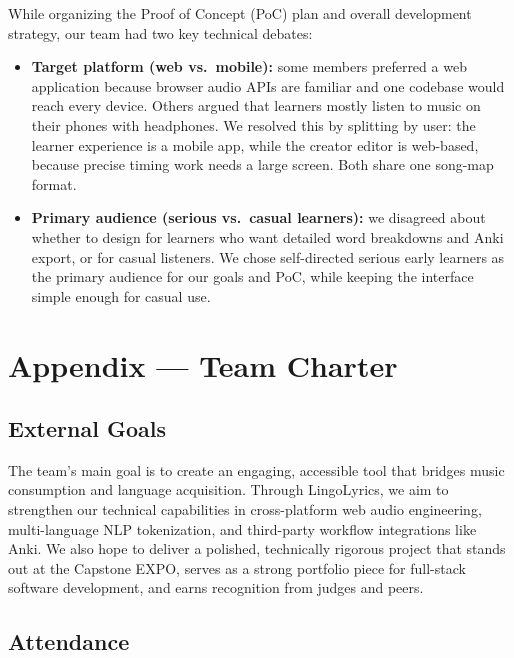 \documentclass{article}
\begin{document}
\begin{enumerate}
    While organizing the Proof of Concept (PoC) plan and overall development strategy, our team had two key technical debates:
    \begin{itemize}
        \item \textbf{Target platform (web vs.\ mobile):} some members preferred
        a web application because browser audio APIs are familiar and one
        codebase would reach every device. Others argued that learners mostly
        listen to music on their phones with headphones. We resolved this by
        splitting by user: the learner experience is a mobile app, while the
        creator editor is web-based, because precise timing work needs a large
        screen. Both share one song-map format.
        \item \textbf{Primary audience (serious vs.\ casual learners):} we
        disagreed about whether to design for learners who want detailed word
        breakdowns and Anki export, or for casual listeners. We chose
        self-directed serious early learners as the primary audience for
        our goals and PoC, while keeping the interface simple enough for casual
        use.
    \end{itemize}
\end{enumerate}

\newpage{}

\section*{Appendix --- Team Charter}

\subsection*{External Goals}
The team's main goal is to create an engaging, accessible tool that bridges music consumption and language acquisition. Through LingoLyrics, we aim to strengthen our technical capabilities in cross-platform web audio engineering, multi-language NLP tokenization, and third-party workflow integrations like Anki. We also hope to deliver a polished, technically rigorous project that stands out at the Capstone EXPO, serves as a strong portfolio piece for full-stack software development, and earns recognition from judges and peers.

\subsection*{Attendance}
\end{document}
